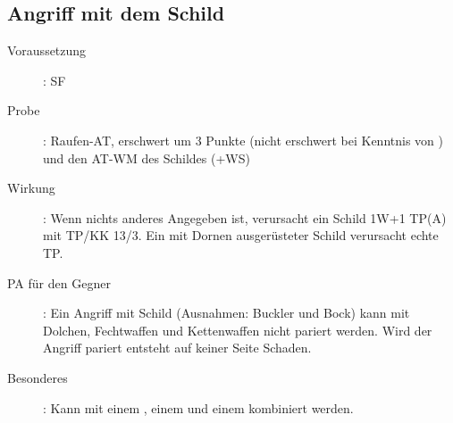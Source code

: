 \subsection{Angriff mit dem Schild}
\label{aktion.angriff_mit_dem_schild}
\begin{description}
    \item[Voraussetzung]:
        SF 
    \item[Probe]:
        Raufen-AT, erschwert um 3 Punkte (nicht erschwert bei Kenntnis von ) und den AT-WM des Schildes (+WS)
    \item[Wirkung]:
        Wenn nichts anderes Angegeben ist, verursacht ein Schild 1W+1 TP(A) mit TP/KK 13/3.
        Ein mit Dornen ausgerüsteter Schild verursacht echte TP.
    \item[PA für den Gegner]:
        Ein Angriff mit Schild (Ausnahmen: Buckler und Bock) kann mit Dolchen, Fechtwaffen und Kettenwaffen nicht pariert werden.
        Wird der Angriff pariert entsteht auf keiner Seite Schaden.
    \item[Besonderes]:
        Kann mit einem , einem  und einem  kombiniert werden.
\end{description}

